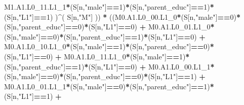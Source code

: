 \documentclass[
]{book}
\newenvironment{Shaded}{\begin{snugshade}}{\end{snugshade}}
\newcommand{\DecValTok}[1]{\textcolor[rgb]{0.00,0.00,0.81}{#1}}
\newcommand{\NormalTok}[1]{#1}
\newcommand{\SpecialCharTok}[1]{\textcolor[rgb]{0.81,0.36,0.00}{\textbf{#1}}}
\newcommand{\StringTok}[1]{\textcolor[rgb]{0.31,0.60,0.02}{#1}}
\begin{document}
\begin{Shaded}
\begin{Highlighting}[]
\NormalTok{          M1.A1.L0\_11.L1\_1}\SpecialCharTok{*}\NormalTok{(S[n,}\StringTok{"male"}\NormalTok{]}\SpecialCharTok{==}\DecValTok{1}\NormalTok{)}\SpecialCharTok{*}\NormalTok{(S[n,}\StringTok{"parent\_educ"}\NormalTok{]}\SpecialCharTok{==}\DecValTok{1}\NormalTok{)}\SpecialCharTok{*}
\NormalTok{          (S[n,}\StringTok{"L1"}\NormalTok{]}\SpecialCharTok{==}\DecValTok{1}\NormalTok{) )}\SpecialCharTok{\^{}}\NormalTok{( S[n,}\StringTok{"M"}\NormalTok{] )) }\SpecialCharTok{*}
\NormalTok{      ((M0.A1.L0\_00.L1\_0}\SpecialCharTok{*}\NormalTok{(S[n,}\StringTok{"male"}\NormalTok{]}\SpecialCharTok{==}\DecValTok{0}\NormalTok{)}\SpecialCharTok{*}\NormalTok{(S[n,}\StringTok{"parent\_educ"}\NormalTok{]}\SpecialCharTok{==}\DecValTok{0}\NormalTok{)}\SpecialCharTok{*}\NormalTok{(S[n,}\StringTok{"L1"}\NormalTok{]}\SpecialCharTok{==}\DecValTok{0}\NormalTok{) }\SpecialCharTok{+}                
\NormalTok{          M0.A1.L0\_01.L1\_0}\SpecialCharTok{*}\NormalTok{(S[n,}\StringTok{"male"}\NormalTok{]}\SpecialCharTok{==}\DecValTok{0}\NormalTok{)}\SpecialCharTok{*}\NormalTok{(S[n,}\StringTok{"parent\_educ"}\NormalTok{]}\SpecialCharTok{==}\DecValTok{1}\NormalTok{)}\SpecialCharTok{*}\NormalTok{(S[n,}\StringTok{"L1"}\NormalTok{]}\SpecialCharTok{==}\DecValTok{0}\NormalTok{) }\SpecialCharTok{+}
\NormalTok{          M0.A1.L0\_10.L1\_0}\SpecialCharTok{*}\NormalTok{(S[n,}\StringTok{"male"}\NormalTok{]}\SpecialCharTok{==}\DecValTok{1}\NormalTok{)}\SpecialCharTok{*}\NormalTok{(S[n,}\StringTok{"parent\_educ"}\NormalTok{]}\SpecialCharTok{==}\DecValTok{0}\NormalTok{)}\SpecialCharTok{*}\NormalTok{(S[n,}\StringTok{"L1"}\NormalTok{]}\SpecialCharTok{==}\DecValTok{0}\NormalTok{) }\SpecialCharTok{+} 
\NormalTok{          M0.A1.L0\_11.L1\_0}\SpecialCharTok{*}\NormalTok{(S[n,}\StringTok{"male"}\NormalTok{]}\SpecialCharTok{==}\DecValTok{1}\NormalTok{)}\SpecialCharTok{*}\NormalTok{(S[n,}\StringTok{"parent\_educ"}\NormalTok{]}\SpecialCharTok{==}\DecValTok{1}\NormalTok{)}\SpecialCharTok{*}\NormalTok{(S[n,}\StringTok{"L1"}\NormalTok{]}\SpecialCharTok{==}\DecValTok{0}\NormalTok{) }\SpecialCharTok{+}
\NormalTok{          M0.A1.L0\_00.L1\_1}\SpecialCharTok{*}\NormalTok{(S[n,}\StringTok{"male"}\NormalTok{]}\SpecialCharTok{==}\DecValTok{0}\NormalTok{)}\SpecialCharTok{*}\NormalTok{(S[n,}\StringTok{"parent\_educ"}\NormalTok{]}\SpecialCharTok{==}\DecValTok{0}\NormalTok{)}\SpecialCharTok{*}\NormalTok{(S[n,}\StringTok{"L1"}\NormalTok{]}\SpecialCharTok{==}\DecValTok{1}\NormalTok{) }\SpecialCharTok{+}
\NormalTok{          M0.A1.L0\_01.L1\_1}\SpecialCharTok{*}\NormalTok{(S[n,}\StringTok{"male"}\NormalTok{]}\SpecialCharTok{==}\DecValTok{0}\NormalTok{)}\SpecialCharTok{*}\NormalTok{(S[n,}\StringTok{"parent\_educ"}\NormalTok{]}\SpecialCharTok{==}\DecValTok{1}\NormalTok{)}\SpecialCharTok{*}\NormalTok{(S[n,}\StringTok{"L1"}\NormalTok{]}\SpecialCharTok{==}\DecValTok{1}\NormalTok{) }\SpecialCharTok{+}

\end{Highlighting}
\end{Shaded}
\end{document}
